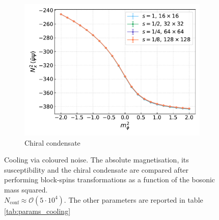 \begin{figure}[hbp]
\begin{subfigure}[b]{0.48\textwidth}
        \includegraphics[width=1.05\textwidth]{figures/cooling/mass_scan/condensate.pdf}
        \caption{Chiral condensate}
    \end{subfigure}
    \caption[Cooling stochastic quantisation: fields as a function of the bosonic mass squared.]{Cooling via coloured noise. The absolute magnetisation, its susceptibility and the chiral condensate are compared after performing block-spins transformations as a function of the bosonic mass squared. \\ $N_\text{conf} \approx \mathcal{O}(5 \cdot 10^4)$. The other parameters are reported in table \ref{tab:params_cooling}}
    \label{fig:cooling_M_psibarpsi_chi2}
\end{figure}

